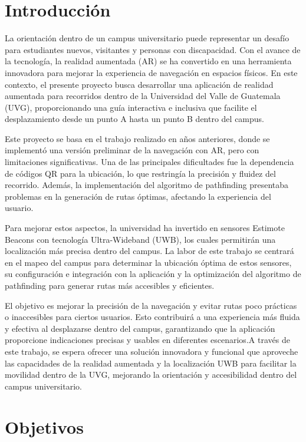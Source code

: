 \documentclass{article}
\begin{document}
\newpage

\section{Introducción}
{\justify
La orientación dentro de un campus universitario puede representar un desafío para estudiantes nuevos, visitantes y personas con
 discapacidad. Con el avance de la tecnología, la realidad aumentada (AR) se ha convertido en una herramienta innovadora para mejorar
  la experiencia de navegación en espacios físicos. En este contexto, el presente proyecto busca desarrollar una aplicación de realidad
   aumentada para recorridos dentro de la Universidad del Valle de Guatemala (UVG), proporcionando una guía interactiva e inclusiva 
   que facilite el desplazamiento desde un punto A hasta un punto B dentro del campus.

Este proyecto se basa en el trabajo realizado en años anteriores, donde se implementó una versión preliminar de la navegación con AR,
 pero con limitaciones significativas. Una de las principales dificultades fue la dependencia de códigos QR para la ubicación, lo que
  restringía la precisión y fluidez del recorrido. Además, la implementación del algoritmo de pathfinding presentaba problemas en la 
  generación de rutas óptimas, afectando la experiencia del usuario.

Para mejorar estos aspectos, la universidad ha invertido en sensores Estimote Beacons con tecnología Ultra-Wideband (UWB), los cuales
 permitirán una localización más precisa dentro del campus. La labor de este trabajo se centrará en el mapeo del campus para 
 determinar la ubicación óptima de estos sensores, su configuración e integración con la aplicación y la optimización del algoritmo
  de pathfinding para generar rutas más accesibles y eficientes.

El objetivo es mejorar la precisión de la navegación y evitar rutas poco prácticas o inaccesibles para ciertos usuarios. Esto 
contribuirá a una experiencia más fluida y efectiva al desplazarse dentro del campus, garantizando que la aplicación proporcione 
indicaciones precisas y usables en diferentes escenarios.A través de este trabajo, se espera ofrecer una solución innovadora y 
funcional que aproveche las capacidades de la realidad aumentada y la localización UWB para facilitar la movilidad dentro de la UVG,
 mejorando la orientación y accesibilidad dentro del campus universitario.}
\newpage

\section{Objetivos}
\end{document}
